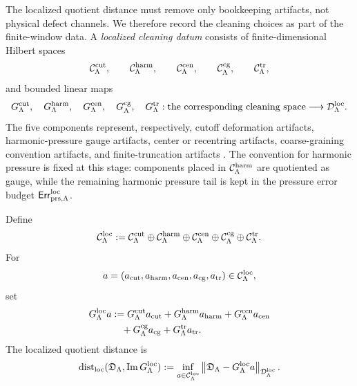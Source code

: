 \documentclass[11pt]{article}
\numberwithin{equation}{section}
\newcommand{\Err}{\mathsf{Err}}
\begin{document}
The localized quotient distance must remove only bookkeeping artifacts, not
physical defect channels.  We therefore record the cleaning choices as part
of the finite-window data.  A \emph{localized cleaning datum} consists of
finite-dimensional Hilbert spaces
\[
        \mathcal C_{\Lambda}^{\rm cut},\qquad
        \mathcal C_{\Lambda}^{\rm harm},\qquad
        \mathcal C_{\Lambda}^{\rm cen},\qquad
        \mathcal C_{\Lambda}^{\rm cg},\qquad
        \mathcal C_{\Lambda}^{\rm tr},
\]
and bounded linear maps
\[
        G_{\Lambda}^{\rm cut},\quad
        G_{\Lambda}^{\rm harm},\quad
        G_{\Lambda}^{\rm cen},\quad
        G_{\Lambda}^{\rm cg},\quad
        G_{\Lambda}^{\rm tr}
        :
        \text{the corresponding cleaning space}
        \longrightarrow
        \mathcal D_\Lambda^{\rm loc}.
\]
The five components represent, respectively, cutoff deformation artifacts,
harmonic-pressure gauge artifacts, center or recentring artifacts,
coarse-graining convention artifacts, and finite-truncation artifacts \cite{ConstantinETiti1994,Eyink1994,DuchonRobert2000}.
The convention for harmonic pressure is fixed at this stage: components
placed in \(\mathcal C_{\Lambda}^{\rm harm}\) are quotiented as gauge, while
the remaining harmonic pressure tail is kept in the pressure error budget
\(\Err_{\rm prs,\Lambda}^{\rm loc}\).

Define
\[
        \mathcal C_\Lambda^{\rm loc}
        :=
        \mathcal C_{\Lambda}^{\rm cut}
        \oplus
        \mathcal C_{\Lambda}^{\rm harm}
        \oplus
        \mathcal C_{\Lambda}^{\rm cen}
        \oplus
        \mathcal C_{\Lambda}^{\rm cg}
        \oplus
        \mathcal C_{\Lambda}^{\rm tr}.
\]
For
\[
        a=(a_{\rm cut},a_{\rm harm},a_{\rm cen},a_{\rm cg},a_{\rm tr})
        \in\mathcal C_\Lambda^{\rm loc},
\]
set
\begin{equation}\label{eq:localized-cleaning-map}
\begin{aligned}
        G_\Lambda^{\rm loc}a
        &:=
        G_{\Lambda}^{\rm cut}a_{\rm cut}
        +
        G_{\Lambda}^{\rm harm}a_{\rm harm}
        +
        G_{\Lambda}^{\rm cen}a_{\rm cen}  \\
        &\quad+
        G_{\Lambda}^{\rm cg}a_{\rm cg}
        +
        G_{\Lambda}^{\rm tr}a_{\rm tr}.
\end{aligned}
\end{equation}
The localized quotient distance is
\begin{equation}\label{eq:localized-quotient-distance}
        \operatorname{dist}_{\rm loc}
        (\mathfrak D_\Lambda,\operatorname{Im}G_\Lambda^{\rm loc})
        :=
        \inf_{a\in\mathcal C_\Lambda^{\rm loc}}
        \left\|
        \mathfrak D_\Lambda-G_\Lambda^{\rm loc}a
        \right\|_{\mathcal D_\Lambda^{\rm loc}} .
\end{equation}
\end{document}
